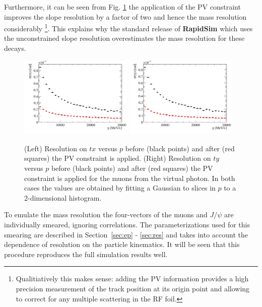 Furthermore, it can be seen from Fig. \ref{fig:sloperes} the application of the PV constraint improves the slope
resolution by a factor of two and
hence the mass resolution considerably \footnote{Qualitiatively this
  makes sense: adding the PV information provides a high precision
  measurement of the track position at its origin point and allowing
  to correct for any multiple scattering in the RF foil.}. This explains why the standard
release of  \textbf{RapidSim} which uses the unconstrained slope resolution
overestimates the mass resolution for these decays.
\begin{figure}[h!]
\centering
\includegraphics[width=0.48\textwidth]{figs/txres.pdf}
\includegraphics[width=0.48\textwidth]{figs/tyres.pdf}
\caption{(Left) Resolution on $tx$ versus $p$ before (black points) and after (red
  squares) the PV constraint is applied. (Right) Resolution on $ty$
  versus $p$ before (black points) and after (red
  squares) the PV constraint is applied for the muons from the virtual
  photon. In both cases the values are
  obtained by fitting a Gaussian to slices in $p$ to a 2-dimensional histogram.
   }
\label{fig:sloperes}
\end{figure}

To emulate the mass resolution the four-vectors of the muons and
$J/\psi$ are individually smeared, ignoring correlations. The parameterizations used for this
smearing are described in Section~\ref{sec:ep} - \ref{sec:res} and
takes into account the dependence of resolution on the particle kinematics. It will be
seen that this procedure reproduces the full simulation results well.
